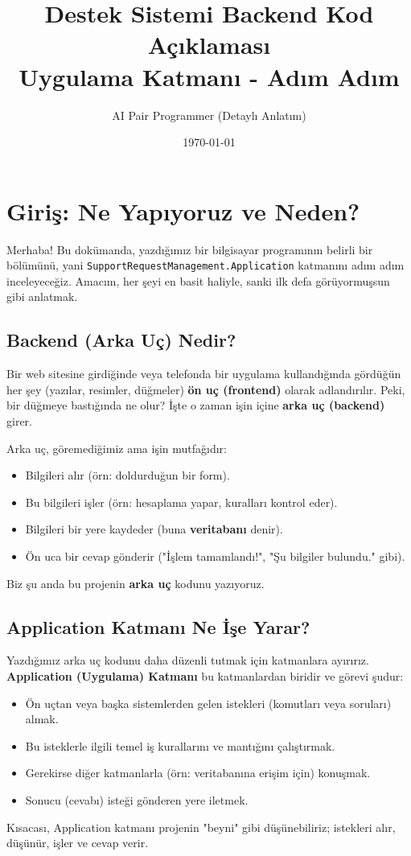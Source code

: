\documentclass[11pt, a4paper]{article}
\title{Destek Sistemi Backend Kod Açıklaması \\ \Large Uygulama Katmanı - Adım Adım}
\author{AI Pair Programmer (Detaylı Anlatım)}
\date{\today}
\begin{document}
\maketitle
\tableofcontents %
\newpage

\section{Giriş: Ne Yapıyoruz ve Neden?}

Merhaba! Bu dokümanda, yazdığımız bir bilgisayar programının belirli bir bölümünü, yani \texttt{SupportRequestManagement.Application} katmanını adım adım inceleyeceğiz. Amacım, her şeyi en basit haliyle, sanki ilk defa görüyormuşsun gibi anlatmak.

\subsection{Backend (Arka Uç) Nedir?}

Bir web sitesine girdiğinde veya telefonda bir uygulama kullandığında gördüğün her şey (yazılar, resimler, düğmeler) \textbf{ön uç (frontend)} olarak adlandırılır. Peki, bir düğmeye bastığında ne olur? İşte o zaman işin içine \textbf{arka uç (backend)} girer.

Arka uç, göremediğimiz ama işin mutfağıdır:
\begin{itemize}
    \item Bilgileri alır (örn: doldurduğun bir form).
    \item Bu bilgileri işler (örn: hesaplama yapar, kuralları kontrol eder).
    \item Bilgileri bir yere kaydeder (buna \textbf{veritabanı} denir).
    \item Ön uca bir cevap gönderir ("İşlem tamamlandı!", "Şu bilgiler bulundu." gibi).
\end{itemize}
Biz şu anda bu projenin \textbf{arka uç} kodunu yazıyoruz.

\subsection{Application Katmanı Ne İşe Yarar?}

Yazdığımız arka uç kodunu daha düzenli tutmak için katmanlara ayırırız. \textbf{Application (Uygulama) Katmanı} bu katmanlardan biridir ve görevi şudur:
\begin{itemize}
    \item Ön uçtan veya başka sistemlerden gelen istekleri (komutları veya soruları) almak.
    \item Bu isteklerle ilgili temel iş kurallarını ve mantığını çalıştırmak.
    \item Gerekirse diğer katmanlarla (örn: veritabanına erişim için) konuşmak.
    \item Sonucu (cevabı) isteği gönderen yere iletmek.
\end{itemize}
Kısacası, Application katmanı projenin "beyni" gibi düşünebiliriz; istekleri alır, düşünür, işler ve cevap verir.
\end{document}
